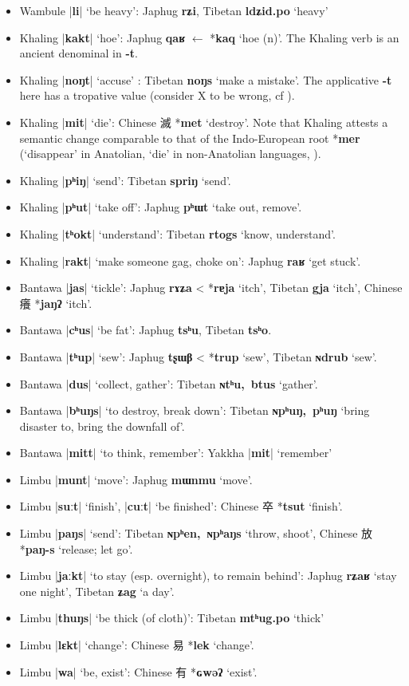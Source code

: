 \documentclass[oneside,a4paper,11pt]{article}
\newcommand{\ipa}[1]{\textbf{{\phon\mbox{#1}}}} %
\newcommand{\zh}[1]{{\cn #1}}
\newcommand{\dhatu}[2]{|\ipa{#1}| `#2'}
\begin{document}
\begin{itemize}
\item Wambule \dhatu{li}{be heavy}: Japhug \ipa{rʑi}, Tibetan \ipa{ldʑid.po} `heavy'
\item Khaling \dhatu{kakt}{hoe}: Japhug \ipa{qaʁ} $\leftarrow$ *\ipa{kaq} `hoe (n)'. The Khaling verb is an ancient denominal in \ipa{-t}.
\item Khaling \dhatu{noŋt}{accuse} : Tibetan \ipa{noŋs} `make a mistake'. The applicative \ipa{-t} here has a tropative value (consider X to be wrong, cf \citealt{jacques13tropative}).
\item Khaling \dhatu{mit}{die}: Chinese \zh{滅} *\ipa{met} `destroy'. Note that Khaling attests a semantic change comparable to that of the Indo-European root *\ipa{mer} (`disappear' in Anatolian, `die' in non-Anatolian languages, \citealt[439-440]{liv}).
\item Khaling \dhatu{pʰiŋ}{send}: Tibetan \ipa{spriŋ} `send'.
\item Khaling \dhatu{pʰut}{take off}: Japhug \ipa{pʰɯt} `take out, remove'.
\item Khaling \dhatu{tʰokt}{understand}: Tibetan \ipa{rtogs} `know, understand'.
\item Khaling \dhatu{rakt}{make someone gag, choke on}: Japhug \ipa{raʁ} `get stuck'.
\item Bantawa \dhatu{jas}{tickle}: Japhug \ipa{rɤʑa} < *\ipa{rɐja} `itch', Tibetan \ipa{gja} `itch', Chinese \zh{癢} *\ipa{jaŋʔ} `itch'.
\item Bantawa \dhatu{cʰus}{be fat}: Japhug \ipa{tsʰu}, Tibetan \ipa{tsʰo}.
\item Bantawa \dhatu{tʰup}{sew}: Japhug \ipa{tʂɯβ} < *\ipa{trup} `sew', Tibetan \ipa{ɴdrub} `sew'.
\item Bantawa \dhatu{dus}{collect, gather}: Tibetan \ipa{ɴtʰu, btus} `gather'.
\item Bantawa \dhatu{bʰuŋs}{to destroy, break down}: Tibetan \ipa{ɴpʰuŋ, pʰuŋ} `bring disaster to, bring the downfall of'.
\item Bantawa \dhatu{mitt}{to think, remember}: Yakkha \dhatu{mit}{remember}
\item Limbu \dhatu{munt}{move}: Japhug \ipa{mɯnmu} `move'.
\item Limbu \dhatu{suːt}{finish}, \dhatu{cuːt}{be finished}: Chinese \zh{卒} *\ipa{tsut} `finish'.
\item Limbu \dhatu{paŋs}{send}: Tibetan \ipa{ɴpʰen, ɴpʰaŋs} `throw, shoot', Chinese \zh{放} *\ipa{paŋ-s} `release; let go'.
\item Limbu \dhatu{jaːkt}{to stay (esp. overnight), to remain behind}: Japhug \ipa{rʑaʁ} `stay one night', Tibetan \ipa{ʑag} `a day'.
\item Limbu \dhatu{thuŋs}{be thick (of cloth)}: Tibetan \ipa{mtʰug.po} `thick'
\item Limbu \dhatu{lɛkt}{change}: Chinese \zh{易} *\ipa{lek} `change'.
\item Limbu \dhatu{wa}{be, exist}: Chinese \zh{有} *\ipa{ɢwəʔ} `exist'.
\end{itemize}
 


\end{document}

